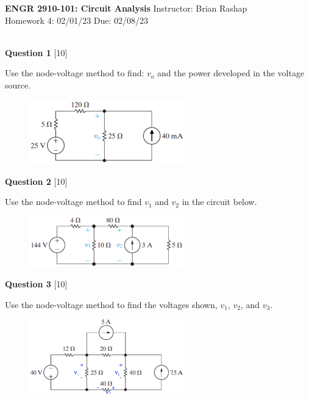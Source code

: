 \documentclass[12pt]{article}
\begin{document}
\begin{center}
\hfil
{\large\bf {ENGR 2910-101: Circuit Analysis}}
\hfill Instructor: Brian Rashap\\
Homework 4: 02/01/23 \hfill Due: 02/08/23\\
\hrulefill\\
\end{center}

{\bf Question 1} [10] %

Use the node-voltage method to find: $v_{o}$ and the power developed in the voltage source.

\begin{figure}[h!]
\begin{center}
 \includegraphics[clip,width=0.6\textwidth]{Fig4-6-v2.png}
\end{center}
\end{figure}


\vspace{0.1in}

{\bf Question 2} [10] %

Use the node-voltage method to find $v_{1}$ and $v_{2}$ in the circuit below.
\begin{figure}[h!]
\begin{center}
 \includegraphics[clip,width=0.6\textwidth]{Fig4-11.png}
\end{center}
\end{figure}

{\bf Question 3} [10] %

Use the node-voltage method to find the voltages shown, $v_{1}$, $v_{2}$, and $v_{3}$.

\begin{figure}[h!]
\begin{center}
 \includegraphics[clip,width=0.6\textwidth]{Fig4-15.png}
\end{center}
\end{figure}
\end{document}
